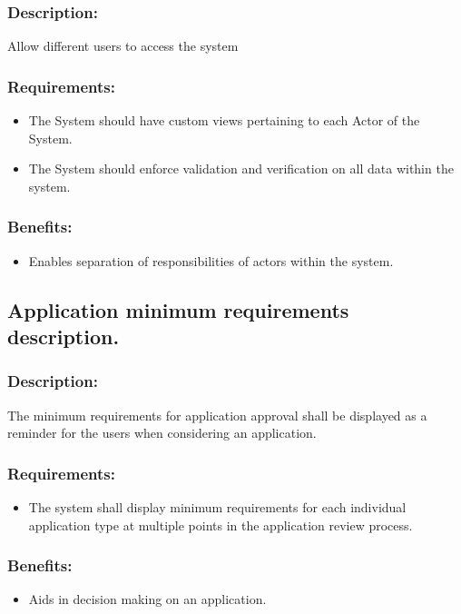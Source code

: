 \documentclass[]{article}
\begin{document}
\subsubsection{ Description: }Allow different users to access the system
\subsubsection{ Requirements:} 
\begin{itemize}
\item The System should have custom views pertaining to each Actor of the System. 
\item The System should enforce validation and verification on all data within the system.
\end{itemize}
\subsubsection{Benefits:}
\begin{itemize}
	\item Enables separation of responsibilities of actors within the system.
\end{itemize}

\subsection{Application minimum requirements description.}
\subsubsection{ Description: }The minimum requirements for application approval shall be displayed as a reminder for the users when considering an application.
\subsubsection{ Requirements:}
\begin{itemize}
\item  The system shall display minimum requirements for each individual application type at multiple points in the application review process.
\end{itemize}
\subsubsection{Benefits:}
\begin{itemize}
	\item Aids in decision making on an application. 
	
\end{itemize}
\end{document}

